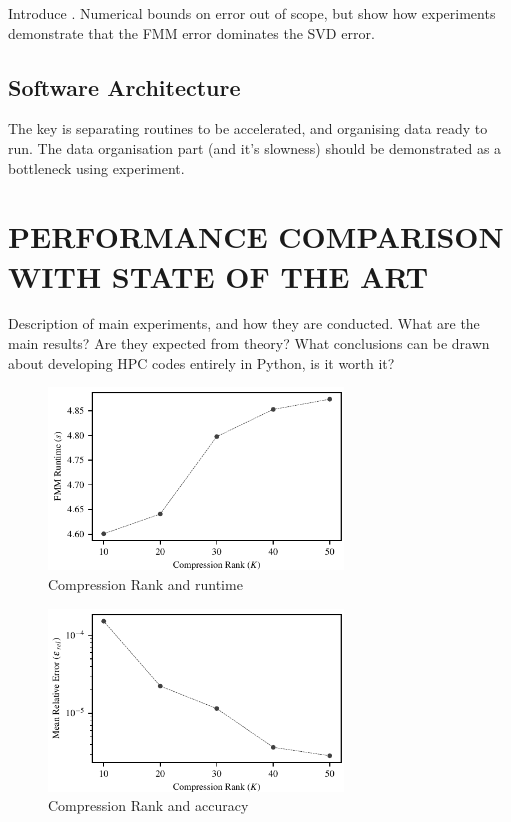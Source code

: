 \documentclass{IEEEcsmag}
\begin{document}
Introduce \cite{Ying2004}. Numerical bounds on error out of scope, but show how experiments demonstrate that the FMM error dominates the SVD error.

\subsection{Software Architecture}

The key is separating routines to be accelerated, and organising data ready to run. The data organisation part (and it's slowness) should be demonstrated as a bottleneck using experiment.

\section{PERFORMANCE COMPARISON WITH STATE OF THE ART}

Description of main experiments, and how they are conducted. What are the main results? Are they expected from theory? What conclusions can be drawn about developing HPC codes entirely in Python, is it worth it?

\begin{figure}
\centerline{\includegraphics[width=18.5pc]{figures/compression_runtime.pdf}}
\caption{Compression Rank and runtime}
\end{figure}

\begin{figure}
\centerline{\includegraphics[width=18.5pc]{figures/compression_accuracy.pdf}}
\caption{Compression Rank and accuracy}
\end{figure}
\end{document}
